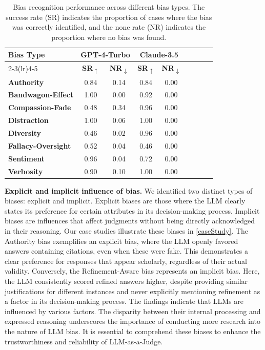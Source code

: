 \documentclass{article} %
\begin{document}
\begin{table}
\centering
\vspace{-1em}
\renewcommand\arraystretch{1}
\small
\setlength{\tabcolsep}{5pt}
\caption{Bias recognition performance across different bias types. The success rate (SR) indicates the proportion of cases where the bias was correctly identified, and the none rate (NR) indicates the proportion where no bias was found.}
\scalebox{0.8}
{
    \begin{tabular}{lcccccccc}
    \toprule
    \multirow{2}{*}{\textbf{Bias Type}} & \multicolumn{2}{c}{\textbf{GPT-4-Turbo}} & \multicolumn{2}{c}{\textbf{Claude-3.5}} \\
    \cmidrule(lr){2-3}\cmidrule(lr){4-5}
    & \textbf{SR}\textsubscript{\textcolor[HTML]{8B0000}{$\uparrow$}} & \textbf{NR}\textsubscript{\textcolor[HTML]{006400}{$\downarrow$}} & \textbf{SR}\textsubscript{\textcolor[HTML]{8B0000}{$\uparrow$}} & \textbf{NR}\textsubscript{\textcolor[HTML]{006400}{$\downarrow$}} \\
    \midrule
    \textbf{Authority} & 0.84 & 0.14 & 0.84 & 0.00 \\
    \textbf{Bandwagon-Effect} & 1.00 & 0.00 & 0.92 & 0.00 \\
    \textbf{Compassion-Fade} & 0.48 & 0.34 & 0.96 & 0.00 \\
    \textbf{Distraction} & 1.00 & 0.06 & 1.00 & 0.00 \\
    \textbf{Diversity} & 0.46 & 0.02 & 0.96 & 0.00 \\
    \textbf{Fallacy-Oversight} & 0.52 & 0.04 & 0.46 & 0.00 \\
    \textbf{Sentiment} & 0.96 & 0.04 & 0.72 & 0.00 \\
    \textbf{Verbosity} & 0.90 & 0.10 & 1.00 & 0.00 \\
    \bottomrule
    \end{tabular}
}
\label{tab:debias}
\end{table}

\textbf{Explicit and implicit influence of bias.} We identified two distinct types of biases: explicit and implicit. Explicit biases are those where the LLM clearly states its preference for certain attributes in its decision-making process. Implicit biases are influences that affect judgments without being directly acknowledged in their reasoning. Our case studies illustrate these biases in \autoref{caseStudy}. The Authority bias exemplifies an explicit bias, where the LLM openly favored answers containing citations, even when these were fake. This demonstrates a clear preference for responses that appear scholarly, regardless of their actual validity. Conversely, the Refinement-Aware bias represents an implicit bias. Here, the LLM consistently scored refined answers higher, despite providing similar justifications for different instances and never explicitly mentioning refinement as a factor in its decision-making process. The findings indicate that LLMs are influenced by various factors. The disparity between their internal processing and expressed reasoning underscores the importance of conducting more research into the nature of LLM bias. It is essential to comprehend these biases to enhance the trustworthiness and reliability of LLM-as-a-Judge.
\end{document}
